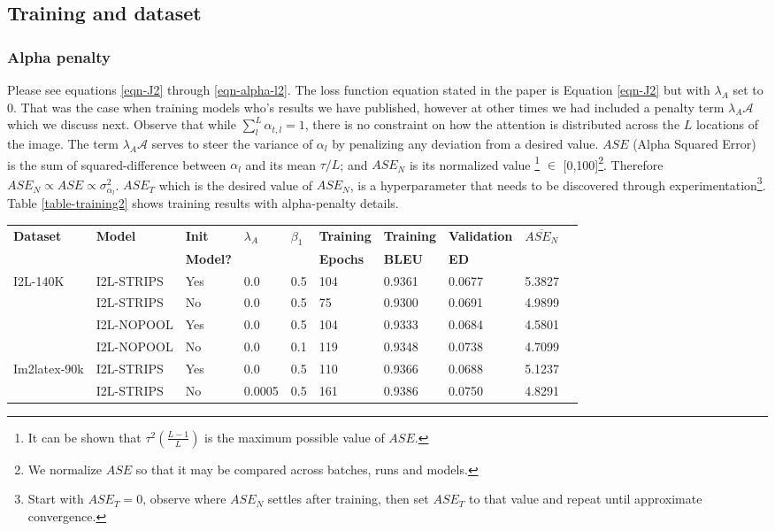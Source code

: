 \subsection{Training and dataset}
\subsubsection{Alpha penalty}
Please see equations \ref{eqn-J2} through \ref{eqn-alpha-l2}. The loss function equation stated in the paper is Equation \ref{eqn-J2} but with $\lambda_A$ set to 0. That was the case when training models who's results we have published, however at other times we had included a penalty term $\lambda_A \mathcal{A}$ which we discuss next. Observe that while {$\sum_{l}^{L} \alpha_{t,l} = 1 $}, there is no constraint on how the attention is distributed across the $L$ locations of the image. The term $\lambda_{A}\mathcal{A}$ serves to steer the variance of $\alpha_l$ by penalizing any deviation from a desired value. ${ASE}$ (Alpha Squared Error) is the sum of squared-difference between $\alpha_l$ and its mean $\tau/L$; and $ASE_N$ is its normalized value \footnote{It can be shown that  $\tau^2 \left( \frac{L-1}{L} \right)$ is the maximum possible value of $ASE$.} $\in$ [0,100]\footnote{We normalize $ASE$ so that it may be compared across batches, runs and models.}. Therefore $ASE_N \propto ASE \propto \sigma_{\alpha_l}^2$.  $ASE_T$ which is the desired value of $ASE_N$, is a hyperparameter that needs to be discovered through experimentation\footnote{Start with $ASE_T=0$, observe where $ASE_N$ settles after training, then set $ASE_T$ to that value and repeat until approximate convergence.}. Table \ref{table-training2} shows training results with alpha-penalty details.
\begin{table*}[!hbtp]
	\caption{Training metrics. $\lambda_R=0.00005 \text{~and~} \beta_2 = 0.9$ for all runs.}
	\begin{tabular}{lll|lll|llll}
		\hline
		\textbf{Dataset} & \textbf{Model} & \textbf{Init}  & \textbf{$\lambda_A$}  &\textbf{$\beta_1$}  & \textbf{Training}  & \textbf{Training}   & \textbf{Validation} & ${\overline{ASE_N}}$\\
		                 &                & \textbf{Model?}&                       &                    & \textbf{Epochs}    & \textbf{BLEU}       & \textbf{ED}         & \\
		\hline 
		I2L-140K    & I2L-STRIPS & Yes & 0.0    & 0.5 & 104 & 0.9361 & 0.0677 & 5.3827 \\
				    & I2L-STRIPS & No  & 0.0    & 0.5 & 75  & 0.9300 & 0.0691 & 4.9899\\
					& I2L-NOPOOL & Yes & 0.0    & 0.5 & 104 & 0.9333 & 0.0684 & 4.5801\\
					& I2L-NOPOOL & No  & 0.0    & 0.1 & 119 & 0.9348 & 0.0738 & 4.7099\\ 
		\hline
		Im2latex-90k& I2L-STRIPS & Yes & 0.0    & 0.5 & 110 & 0.9366 & 0.0688 & 5.1237\\
		& I2L-STRIPS & No  & 0.0005 & 0.5 & 161 & 0.9386 & 0.0750 & 4.8291\\
		\hline
	\end{tabular}
	\centering
	\label{table-training2}
\end{table*}
